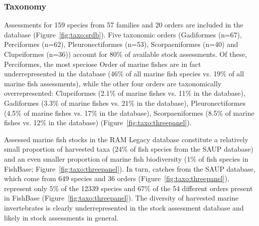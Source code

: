 
\subsubsection*{Taxonomy}

Assessments for 159 species from
57 families and 20
orders are included in the database (Figure~\ref{fig:taxo:srdb}). Five
taxonomic orders (Gadiformes (n=67),
Perciformes (n=62), Pleuronectiformes (n=53),
Scorpaeniformes (n=40) and Clupeiformes (n=36)) account for
80\% of available stock assessments.  Of these, Perciformes, the most
speciose Order of marine fishes are in fact underrepresented in the
database (46\% of all marine fish species vs.  19\% of all marine
fish assessments), while the other four orders are
taxonomically overrepresented: Clupeiformes (2.1\% of marine fishes
vs.  11\% in the database), Gadiformes (3.3\% of marine fishes vs.
21\% in the database), Pleuronectiformes (4.5\% of marine fishes vs.
17\% in the database), Scorpaeniformes (8.5\% of marine fishes vs.
12\% in the database) (Figure~\ref{fig:taxo:threepanel}).

Assessed marine fish stocks in the RAM Legacy database constitute a
relatively small proportion of harvested taxa
(24\% of fish species from the SAUP database)
and an even smaller proportion of marine fish biodiversity
(1\% of fish species in FishBase;
Figure~\ref{fig:taxo:threepanel}). In turn, catches from the SAUP
database, which come from 649 species and
36 orders (Figure~\ref{fig:taxo:threepanel}),
represent only 5\% of the
12339 species and 67\%
of the 54 different orders present in FishBase
(Figure~\ref{fig:taxo:threepanel}). The diversity of harvested marine
invertebrates is clearly underrepresented in the stock assessment
database and likely in stock assessments in general.




